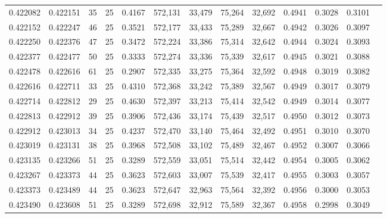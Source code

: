 \begin{tabular}{rrrrrrrrrrrrr}
0.422082 & 0.422151 &    35 &  25 &                                     0.4167 & 572,131 &  33,479 &  75,264 &  32,692 & 0.4941 & 0.3028 & 0.3101 \\
0.422152 & 0.422247 &    46 &  25 &                                     0.3521 & 572,177 &  33,433 &  75,289 &  32,667 & 0.4942 & 0.3026 & 0.3097 \\
0.422250 & 0.422376 &    47 &  25 &                                     0.3472 & 572,224 &  33,386 &  75,314 &  32,642 & 0.4944 & 0.3024 & 0.3093 \\
0.422377 & 0.422477 &    50 &  25 &                                     0.3333 & 572,274 &  33,336 &  75,339 &  32,617 & 0.4945 & 0.3021 & 0.3088 \\
0.422478 & 0.422616 &    61 &  25 &                                     0.2907 & 572,335 &  33,275 &  75,364 &  32,592 & 0.4948 & 0.3019 & 0.3082 \\
0.422616 & 0.422711 &    33 &  25 &                                     0.4310 & 572,368 &  33,242 &  75,389 &  32,567 & 0.4949 & 0.3017 & 0.3079 \\
0.422714 & 0.422812 &    29 &  25 &                                     0.4630 & 572,397 &  33,213 &  75,414 &  32,542 & 0.4949 & 0.3014 & 0.3077 \\
0.422813 & 0.422912 &    39 &  25 &                                     0.3906 & 572,436 &  33,174 &  75,439 &  32,517 & 0.4950 & 0.3012 & 0.3073 \\
0.422912 & 0.423013 &    34 &  25 &                                     0.4237 & 572,470 &  33,140 &  75,464 &  32,492 & 0.4951 & 0.3010 & 0.3070 \\
0.423019 & 0.423131 &    38 &  25 &                                     0.3968 & 572,508 &  33,102 &  75,489 &  32,467 & 0.4952 & 0.3007 & 0.3066 \\
0.423135 & 0.423266 &    51 &  25 &                                     0.3289 & 572,559 &  33,051 &  75,514 &  32,442 & 0.4954 & 0.3005 & 0.3062 \\
0.423267 & 0.423373 &    44 &  25 &                                     0.3623 & 572,603 &  33,007 &  75,539 &  32,417 & 0.4955 & 0.3003 & 0.3057 \\
0.423373 & 0.423489 &    44 &  25 &                                     0.3623 & 572,647 &  32,963 &  75,564 &  32,392 & 0.4956 & 0.3000 & 0.3053 \\
0.423490 & 0.423608 &    51 &  25 &                                     0.3289 & 572,698 &  32,912 &  75,589 &  32,367 & 0.4958 & 0.2998 & 0.3049 \\

\end{tabular}
